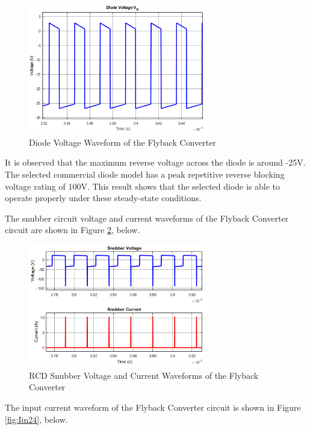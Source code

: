 \begin{figure}[H]
\begin{center}
\includegraphics[width=0.7\textwidth]{figures/V_diode_24.png}
\caption{Diode Voltage Waveform of the Flyback Converter}
\label{fig:diode24}
\end{center}
\end{figure}

It is observed that the maximum reverse voltage across the diode is around -25V. The selected commercial diode model has a peak repetitive reverse blocking voltage rating of 100V. This result shows that the selected diode is able to operate properly under these steady-state conditions.

The snubber circuit voltage and current waveforms of the Flyback Converter circuit are shown in Figure \ref{fig:snubber24}, below.

\begin{figure}[H]
\begin{center}
\includegraphics[width=0.7\textwidth]{figures/snubber_24.png}
\caption{RCD Snubber Voltage and Current Waveforms of the Flyback Converter}
\label{fig:snubber24}
\end{center}
\end{figure}

The input current waveform of the Flyback Converter circuit is shown in Figure \ref{fig:Iin24}, below.


